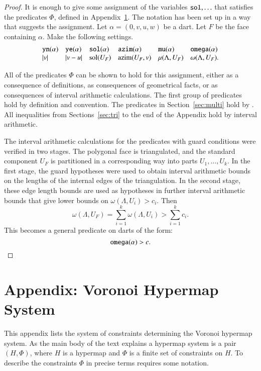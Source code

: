 \documentclass{article} %
\begin{document}
\begin{proof}  It is enough to give some assignment of the variables
${\operatorname{{\texttt{sol}}}},\ldots$ that satisfies the predicates $\Phi$, defined
in Appendix~\ref{ap:A}.  The notation has been set up in a way that
suggests the assignment.  
Let $\alpha = (0,v,u,w)$ be a dart.  Let $F$ be the face containing $\alpha$. Make the following settings.
$$
\begin{array}{llllllllllll}
{\operatorname{{\texttt{yn}}}}(\alpha) & {\operatorname{{\texttt{ye}}}}(\alpha) & {\operatorname{{\texttt{sol}}}}(\alpha) & {\operatorname{{\texttt{azim}}}}(\alpha) & {\operatorname{{\texttt{mu}}}}(\alpha) & {\operatorname{{\texttt{omega}}}}(\alpha) \\
|v|               & |v-u|           & \operatorname{sol}(U_F)   & {\operatorname{azim}}(U_F,v) & \mu(\Lambda,U_F) & \omega(\Lambda,U_F).\\
\end{array}
$$

All of the predicates $\Phi$ can be shown to hold for this assignment,
either as a consequence of definitions, as consequences of geometrical facts, or
as consequences of interval arithmetic calculations.
The first group of predicates hold by definition and convention.
%
The predicates in Section~\ref{sec:multi} hold by \cite[Lemma~5.2]{arx}.
%
All inequalities from Sections~\ref{sec:tri} to the end of the
Appendix hold by interval arithmetic.

The interval arithmetic calculations for the predicates with guard
conditions were verified in two stages.  
The polygonal face is triangulated, and
the standard component $U_F$ is partitioned in a corresponding
way into parts $U_1,\ldots,U_k$.
In the first stage,
the guard hypotheses were used to obtain interval
arithmetic bounds on the lengths of the internal edges of the triangulation.
In the second stage, these edge length bounds are used as hypotheses
in further interval arithmetic bounds that give lower bounds on
$\omega(\Lambda,U_i) > c_i$.  Then
  $$\omega(\Lambda,U_F) = \sum_{i=1}^k\omega(\Lambda,U_i) >\sum_{i=1}^k c_i.$$
This becomes a general predicate on darts of the form:
$$
{\operatorname{{\texttt{omega}}}}(\alpha) > c.
$$
\end{proof}


\section{Appendix: Voronoi Hypermap System}\label{ap:A}

This appendix  lists the system of constraints determining
the Voronoi hypermap system.  As the main body of the text explains
a hypermap system is a pair $(H,\Phi)$, where $H$ is a hypermap
and $\Phi$ is a finite set of constraints on $H$.  To describe
the constraints $\Phi$ in precise terms requires some notation.
\end{document}
